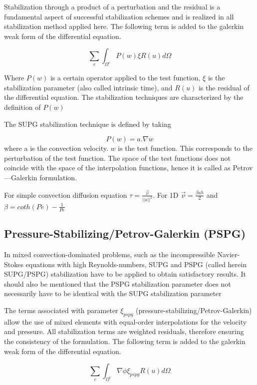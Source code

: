 \documentclass[10pt]{ubthesis}
\begin{document}
\bigskip
\noindent Stabilization through a product of a perturbation and the residual
is a fundamental aspect of successful stabilization schemes and is realized in all stabilization method
applied here. The following term is added to the galerkin weak form of the differential equation. 

 $$\sum_e \int_{\Omega^e} P(w) \xi R(u)  d\Omega$$ 


\bigskip
\noindent Where $P(w)$ is a certain operator applied to the test function, $\xi$ is the stabilization
parameter (also called intrinsic time), and $R(u)$ is the residual of the differential
equation. The stabilization techniques are characterized by the definition of $P(w)$

\bigskip
\noindent The SUPG stabilization technique is defined by taking


$$P(w)= a.\nabla w$$ \noindent where a is the convection velocity. $w$ is the test function.  This corresponds to the perturbation of the test function. The space of the test functions does not coincide with the space of the interpolation functions, hence it is called as Petrov—Galerkin formulation.

\noindent For simple convection diffusion equation
\bigskip
 $\tau = \frac{\overrightarrow{\nu}}{\vert \vert a \vert\vert^2}$. For 1D $\overrightarrow{\nu}=\frac{\beta a h}{2}$ and $\beta = coth(Pe)-\frac{1}{Pe}$
 
 \subsection{Pressure-Stabilizing/Petrov-Galerkin (PSPG)} 
 
 In mixed convection-dominated problems, such as the incompressible Navier-Stokes equations
 with high Reynolds-numbers, SUPG and PSPG (called herein SUPG/PSPG) stabilization have to
 be applied to obtain satisfactory results. It should also be mentioned that the PSPG stabilization parameter does not necessarily have to be identical with the SUPG stabilization parameter
 
 \bigskip
 \noindent The terms associated with parameter $\xi_{pspg}$ (pressure-stabilizing/Petrov-Galerkin)
 allow the use of mixed elements with equal-order interpolations for the velocity and
 pressure. All stabilization
 terms are weighted residuals, therefore ensuring the consistency of the formulation. The following term is added to the galerkin weak form of the differential equation. 
 
  $$\sum_e \int_{\Omega^e} \nabla \phi \xi_{pspg} R(u)  d\Omega$$ 
 
\end{document}
